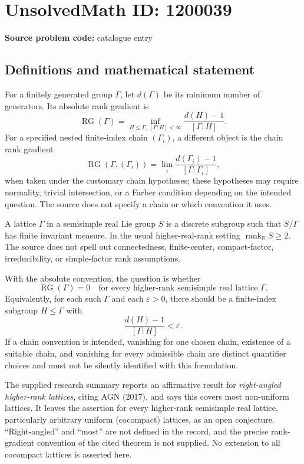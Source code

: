 \documentclass[11pt]{article}
\newcommand{\R}{\mathbb{R}}
\begin{document}
\section*{UnsolvedMath ID: 1200039}
\textbf{Source problem code:} catalogue entry
\subsection{Definitions and mathematical statement}
For a finitely generated group $\Gamma$, let $d(\Gamma)$ be its minimum number of generators. Its absolute rank gradient is
\[
\operatorname{RG}(\Gamma)=
\inf_{H\leq\Gamma,\ [\Gamma:H]<\infty}
\frac{d(H)-1}{[\Gamma:H]}.
\]
For a specified nested finite-index chain $(\Gamma_i)$, a different object is the chain rank gradient
\[
\operatorname{RG}(\Gamma,(\Gamma_i))=
\lim_i\frac{d(\Gamma_i)-1}{[\Gamma:\Gamma_i]},
\]
when taken under the customary chain hypotheses; these hypotheses may require normality, trivial intersection, or a Farber condition depending on the intended question. The source does not specify a chain or which convention it uses.

A lattice $\Gamma$ in a semisimple real Lie group $S$ is a discrete subgroup such that $S/\Gamma$ has finite invariant measure. In the usual higher-real-rank setting $\operatorname{rank}_{\R}S\geq2$. The source does not spell out connectedness, finite-center, compact-factor, irreducibility, or simple-factor rank assumptions.

With the absolute convention, the question is whether
\[
\operatorname{RG}(\Gamma)=0
\quad\text{for every higher-rank semisimple real lattice }\Gamma.
\]
Equivalently, for each such $\Gamma$ and each $\varepsilon>0$, there should be a finite-index subgroup $H\leq\Gamma$ with
\[
\frac{d(H)-1}{[\Gamma:H]}<\varepsilon.
\]
If a chain convention is intended, vanishing for one chosen chain, existence of a suitable chain, and vanishing for every admissible chain are distinct quantifier choices and must not be silently identified with this formulation.

The supplied research summary reports an affirmative result for \emph{right-angled higher-rank lattices}, citing AGN (2017), and says this covers most non-uniform lattices. It leaves the assertion for every higher-rank semisimple real lattice, particularly arbitrary uniform (cocompact) lattices, as an open conjecture. ``Right-angled'' and ``most'' are not defined in the record, and the precise rank-gradient convention of the cited theorem is not supplied. No extension to all cocompact lattices is asserted here.
\end{document}
